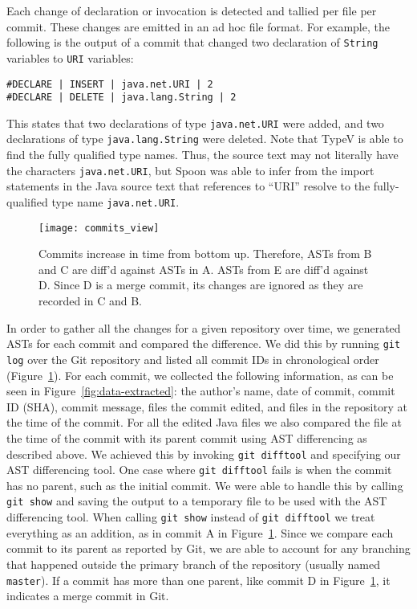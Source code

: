 Each change of declaration or invocation is detected and tallied per file per commit. These changes are emitted in an ad hoc file format. For example, the following is the output of a commit that changed two declaration of \texttt{String} variables to \texttt{URI} variables:

\begin{verbatim}
#DECLARE | INSERT | java.net.URI | 2
#DECLARE | DELETE | java.lang.String | 2
\end{verbatim}

This states that two declarations of type \texttt{java.net.URI} were added, and two declarations of type \texttt{java.lang.String} were deleted. Note that TypeV is able to find the fully qualified type names. Thus, the source text may not literally have the characters \texttt{java.net.URI}, but Spoon was able to infer from the import statements in the Java source text that references to ``URI'' resolve to the fully-qualified type name \texttt{java.net.URI}. 

\begin{figure}[h]
\centering
\texttt{[image: commits\_view]}
\caption{Commits increase in time from bottom up. Therefore, ASTs from B and C are diff'd against ASTs in A. ASTs from E are diff'd against D. Since D is a merge commit, its changes are ignored as they are recorded in C and B.}
\label{fig:commits}
\end{figure}

In order to gather all the changes for a given repository over time, we generated ASTs for each commit and compared the difference. We did this by running \texttt{git log} over the Git repository and listed all commit IDs in chronological order (Figure~\ref{fig:commits}). For each commit, we collected the following information, as can be seen in Figure~\ref{fig:data-extracted}: the author's name, date of commit, commit ID (SHA), commit message, files the commit edited, and files in the repository at the time of the commit. For all the edited Java files we also compared the file at the time of the commit with its parent commit using AST differencing as described above. We achieved this by invoking \texttt{git difftool} and specifying our AST differencing tool. One case where \texttt{git difftool} fails is when the commit has no parent, such as the initial commit. We were able to handle this by calling \texttt{git show} and saving the output to a temporary file to be used with the AST differencing tool. When calling \texttt{git show} instead of \texttt{git difftool} we treat everything as an addition, as in commit A in Figure~\ref{fig:commits}. Since we compare each commit to its parent as reported by Git, we are able to account for any branching that happened outside the primary branch of the repository (usually named \texttt{master}). If a commit has more than one parent, like commit D in Figure~\ref{fig:commits}, it indicates a merge commit in Git.

